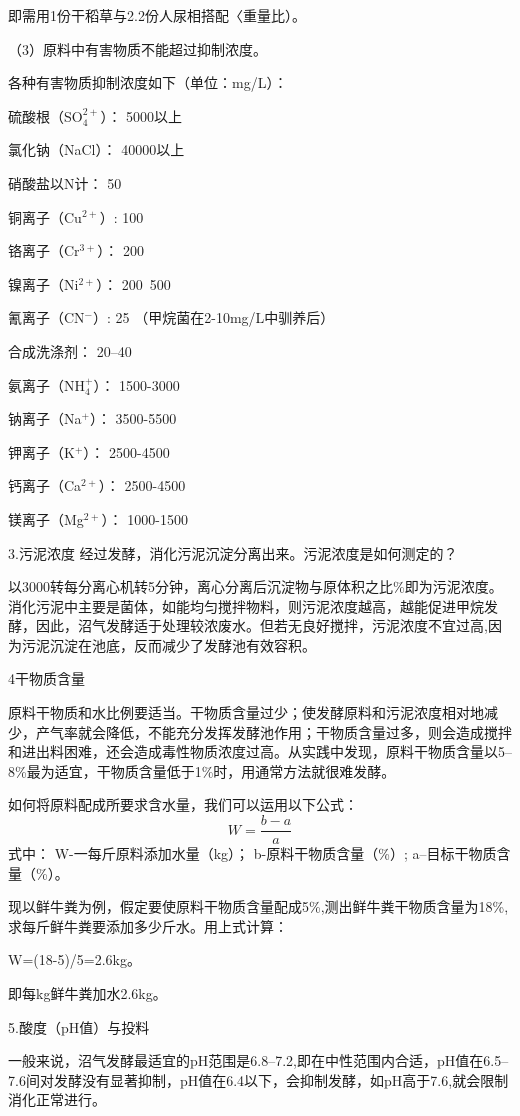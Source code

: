 \documentclass{ctexbook}
\begin{document}
即需用1份干稻草与2.2份人尿相搭配〈重量比）。

（3）原料中有害物质不能超过抑制浓度。

各种有害物质抑制浓度如下（单位：mg/L）：

硫酸根（SO$_4^{2+}$）：	5000以上

氯化钠（NaCl）：	40000以上

硝酸盐以N计：	50

铜离子（Cu$^{2+}$）:    100

铬离子（Cr$^{3+}$）：	  200

镍离子（Ni$^{2+}$）：	  200~500

氰离子（CN$^{-}$）:	25 （甲烷菌在2-10mg/L中驯养后）

合成洗涤剂：	20--40

氨离子（NH$_4^{+}$）：	1500-3000

钠离子（Na$^{+}$）：	3500-5500

钾离子（K$^{+}$）：	2500-4500

钙离子（Ca$^{2+}$）：	2500-4500

镁离子（Mg$^{2+}$）：	1000-1500

3.污泥浓度	
经过发酵，消化污泥沉淀分离出来。污泥浓度是如何测定的？

以3000转每分离心机转5分钟，离心分离后沉淀物与原体积之比\%即为污泥浓度。消化污泥中主要是菌体，如能均匀搅拌物料，则污泥浓度越高，越能促进甲烷发酵，因此，沼气发酵适于处理较浓废水。但若无良好搅拌，污泥浓度不宜过高,因为污泥沉淀在池底，反而减少了发酵池有效容积。

4干物质含量

原料干物质和水比例要适当。干物质含量过少；使发酵原料和污泥浓度相对地减少，产气率就会降低，不能充分发挥发酵池作用；干物质含量过多，则会造成搅拌和进出料困难，还会造成毒性物质浓度过高。从实践中发现，原料干物质含量以5--8\%最为适宜，干物质含量低于1\%时，用通常方法就很难发酵。

如何将原料配成所要求含水量，我们可以运用以下公式：
\begin{equation*}
	W=\frac{b-a}{a}
\end{equation*}
式中：	
W-一每斤原料添加水量（kg）；
b-原料干物质含量（\%）;
a--目标干物质含量（\%）。

现以鲜牛粪为例，假定要使原料干物质含量配成5\%,测出鲜牛粪干物质含量为18\%,求每斤鲜牛粪要添加多少斤水。用上式计算：

W=(18-5)/5=2.6kg。

即每kg鲜牛粪加水2.6kg。

5.酸度（pH值）与投料

一般来说，沼气发酵最适宜的pH范围是6.8--7.2,即在中性范围内合适，pH值在6.5--7.6间对发酵没有显著抑制，pH值在6.4以下，会抑制发酵，如pH高于7.6,就会限制消化正常进行。
\end{document}
